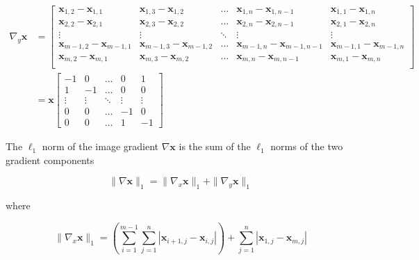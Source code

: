 \documentclass[12pt]{article}
\begin{document}
\begin{equation}
  \begin{aligned}
  \nabla_{y} \mathbf{x} &= \begin{bmatrix}
    \mathbf{x}_{1,2} - \mathbf{x}_{1,1} & \mathbf{x}_{1,3} - \mathbf{x}_{1,2} & \ldots & \mathbf{x}_{1,n} - \mathbf{x}_{1,n-1} & \mathbf{x}_{1,1} - \mathbf{x}_{1,n} \\
    \mathbf{x}_{2,2} - \mathbf{x}_{2,1} & \mathbf{x}_{2,3} - \mathbf{x}_{2,2} & \ldots & \mathbf{x}_{2,n} - \mathbf{x}_{2,n-1} & \mathbf{x}_{2,1} - \mathbf{x}_{2,n}  \\
    \vdots & \vdots & \ddots & \vdots & \vdots \\
    \mathbf{x}_{m-1,2} - \mathbf{x}_{m-1,1} & \mathbf{x}_{m-1,3} - \mathbf{x}_{m-1,2} & \ldots & \mathbf{x}_{m-1,n} - \mathbf{x}_{m-1,n-1} & \mathbf{x}_{m-1,1} - \mathbf{x}_{m-1,n} \\
    \mathbf{x}_{m,2} - \mathbf{x}_{m,1} & \mathbf{x}_{m,3} - \mathbf{x}_{m,2} & \ldots & \mathbf{x}_{m,n} - \mathbf{x}_{m,n-1} & \mathbf{x}_{m,1} - \mathbf{x}_{m,n} \\
  \end{bmatrix} \\
  &=  \mathbf{x} \begin{bmatrix}
    -1 & 0 & \ldots & 0 & 1 \\
    1 & -1 & \ldots & 0 & 0 \\
    \vdots & \vdots & \ddots & \vdots & \vdots \\
    0 & 0 & \ldots & -1 & 0 \\
    0 & 0 & \ldots & 1 & -1
    \end{bmatrix}
  \end{aligned}
\end{equation}




The $\ell_1$ norm of the image gradient $\nabla \mathbf{x}$ is the sum of the $\ell_1$ norms of the two gradient components

\begin{equation}
  \| \nabla \mathbf{x} \|_1 = \| \nabla_x \mathbf{x} \|_1 + \| \nabla_y \mathbf{x} \|_1
\end{equation}

where

\begin{equation}
  \| \nabla_x \mathbf{x} \|_1 = \left( \sum_{i=1}^{m-1} \sum_{j=1}^{n} |\mathbf{x}_{i+1,j} - \mathbf{x}_{i,j}| \right) + \sum_{j=1}^{n} |\mathbf{x}_{1, j} - \mathbf{x}_{m,j}|
\end{equation}
\end{document}
